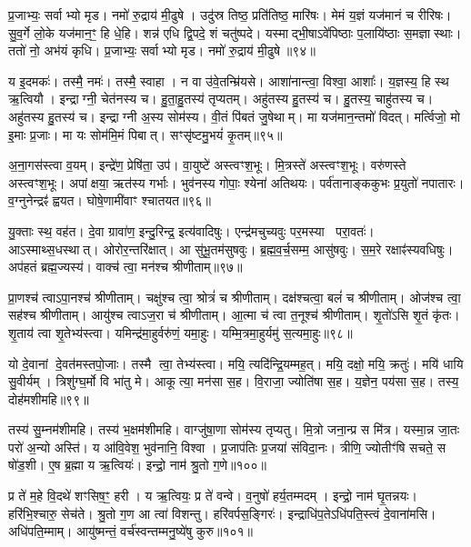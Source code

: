 प्र॒जाभ्यः॒ सर्वाभ्यो मृड।
नमो॑ रु॒द्राय॑ मी॒ढुषे।
उदु॑स्र तिष्ठ॒ प्रति॑तिष्ठ॒ मारि॑षः।
मेमं य॒ज्ञं यज॑मानं च रीरिषः।
सु॒व॒र्गे लो॒के यज॑मान॒ꣳ॒ हि धे॒हि।
शन्न॑ एधि द्वि॒पदे॒ शं चतु॑ष्पदे।
यस्माद्भी॒षा\-ऽवे॑पिष्ठाः प॒लायि॑ष्ठाः स॒मज्ञास्थाः।
ततो॑ नो॒ अभ॑यं कृधि।
प्र॒जाभ्यः॒ सर्वाभ्यो मृड।
नमो॑ रु॒द्राय॑ मी॒ढुषे॥९४॥

य इ॒दमकः॑।
तस्मै॒ नमः॑।
तस्मै॒ स्वाहा।
न वा उ॑वे॒तन्म्रि॑यसे।
आशा॑नान्त्वा॒ विश्वा॒ आशाः᳚।
य॒ज्ञस्य॒ हि स्थ ऋ॒त्वियौ।
इन्द्राग्नी॒ चेत॑नस्य च।
हु॒ता॒हु॒तस्य॑ तृप्यतम्।
अहु॑तस्य हु॒तस्य॑ च।
हु॒तस्य॒ चाहु॑तस्य च।
अहु॑तस्य हु॒तस्य॑ च।
इन्द्राग्नी अ॒स्य सोम॑स्य।
वी॒तं पि॑बतं जु॒षेथाम्।
मा यज॑मान॒न्तमो॑ विदत्।
मर्त्विजो॒ मो इ॒माः प्र॒जाः।
मा यः सोम॑मि॒मं पिबात्।
सꣳसृ॑ष्टमु॒भयं॑ कृ॒तम्॥९५॥\anuvakamend[कृ॒धि॒ मी॒ढुषे\-ऽहु॑तस्य च स॒प्त च॑]

अ॒ना॒गस॑स्त्वा व॒यम्।
इन्द्रे॑ण॒ प्रेषि॑ता॒ उप॑।
वा॒युष्टे॑ अस्त्वꣳश॒भूः।
मि॒त्रस्ते॑ अस्त्वꣳश॒भूः।
वरु॑णस्ते अस्त्वꣳश॒भूः।
अपांक्षया॒ ऋत॑स्य गर्भाः।
भुव॑नस्य गोपाः॒ श्येना॑ अतिथयः।
पर्व॑तानाङ्ककुभः प्र॒युतो॑ नपातारः।
व॒ग्नुनेन्द्रꣴ॑ ह्वयत।
घोषे॒णामी॑वाꣳ श्चातयत॥९६॥

यु॒क्ताः स्थ॒ वह॑त।
दे॒वा ग्रावा॑ण॒ इन्दु॒रिन्द्र॒ इत्य॑वादिषुः।
एन्द्र॑मचुच्यवुः पर॒मस्या परा॒वतः॑।
आऽस्माथ्स॒धस्थात्।
ओरोर॒न्तरि॑क्षात्।
आ सु॑भू॒तम॑सुषवुः।
ब्र॒ह्म॒व॒र्च॒सम्म॒ आसु॑षवुः।
स॒म॒रे रक्षाꣴ॑स्यवधिषुः।
अप॑हतं ब्रह्म॒ज्यस्य॑।
वाक्च॑ त्वा॒ मन॑श्च श्रीणीताम्॥९७॥

प्रा॒णश्च॑ त्वा\-ऽपा॒नश्च॑ श्रीणीताम्।
चक्षु॑श्च त्वा॒ श्रोत्रं॑ च श्रीणीताम्।
दक्ष॑श्चत्वा॒ बलं॑ च श्रीणीताम्।
ओज॑श्च त्वा॒ सह॑श्च श्रीणीताम्।
आयु॑श्च त्वा\-ऽज॒रा च॑ श्रीणीताम्।
आ॒त्मा च॑ त्वा त॒नूश्च॑ श्रीणीताम्।
शृ॒तो॑ऽसि शृ॒तं कृ॑तः।
शृ॒ताय॑ त्वा शृ॒तेभ्य॑स्त्वा।
यमिन्द्र॑मा॒हुर्वरु॑णं॒ यमा॒हुः।
यम्मि॒त्रमा॒हुर्यमु॑ स॒त्यमा॒हुः॥९८॥

यो दे॒वानां दे॒वत॑मस्तपो॒जाः।
तस्मै त्वा॒ तेभ्य॑स्त्वा।
मयि॒ त्यदि॑न्द्रि॒यम्मह॒त्।
मयि॒ दक्षो॒ मयि॒ क्रतुः॑।
मयि॑ धायि सु॒वीर्यम्।
त्रिशु॑ग्घ॒र्मो वि भा॑तु मे।
आकूत्या॒ मन॑सा स॒ह।
वि॒राजा॒ ज्योति॑षा स॒ह।
य॒ज्ञेन॒ पय॑सा स॒ह।
तस्य॒ दोह॑मशीमहि॥९९॥

तस्य॑ सु॒म्नम॑शीमहि।
तस्य॑ भ॒क्षम॑शीमहि।
वाग्जु॑षा॒णा सोम॑स्य तृप्यतु।
मि॒त्रो जना॒न्प्र स मि॑त्र।
यस्मा॒न्न जा॒तः परो॑ अ॒न्यो अस्ति॑।
य आ॑वि॒वेश॒ भुव॑नानि॒ विश्वा।
प्र॒जाप॑तिः प्र॒जया॑ संविदा॒नः।
त्रीणि॒ ज्योतीꣳ॑षि सचते॒ स षो॑ड॒शी।
ए॒ष ब्र॒ह्मा य ऋ॒त्वियः॑।
इन्द्रो॒ नाम॑ श्रु॒तो ग॒णे॥१००॥

प्र ते॑ म॒हे वि॒दथे॑ शꣳसिष॒ꣳ॒ हरी।
य ऋ॒त्वियः॒ प्र ते॑ वन्वे।
व॒नुषो॑ हर्य॒तम्मदम्।
इन्द्रो॒ नाम॑ घृ॒तन्नयः।
हरि॑भि॒श्चारु॒ सेच॑ते।
श्रु॒तो ग॒ण आ त्वा॑ विशन्तु।
हरि॑वर्पस॒ङ्गिरः॑।
इन्द्राधि॑प॒ते\-ऽधि॑पति॒स्त्वं दे॒वाना॑मसि।
अधि॑पति॒म्माम्।
आयु॑ष्मन्तं॒ वर्च॑स्वन्तम्मनु॒ष्ये॑षु कुरु॥१०१॥

